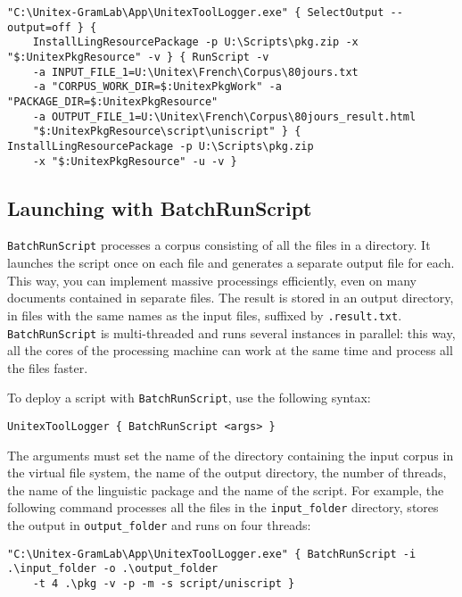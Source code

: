 \begin{Verbatim}[fontsize=\small,fontfamily=helvetica]
"C:\Unitex-GramLab\App\UnitexToolLogger.exe" { SelectOutput --output=off } {
    InstallLingResourcePackage -p U:\Scripts\pkg.zip -x "$:UnitexPkgResource" -v } { RunScript -v
    -a INPUT_FILE_1=U:\Unitex\French\Corpus\80jours.txt 
    -a "CORPUS_WORK_DIR=$:UnitexPkgWork" -a "PACKAGE_DIR=$:UnitexPkgResource"
    -a OUTPUT_FILE_1=U:\Unitex\French\Corpus\80jours_result.html 
    "$:UnitexPkgResource\script\uniscript" } { InstallLingResourcePackage -p U:\Scripts\pkg.zip 
    -x "$:UnitexPkgResource" -u -v }
\end{Verbatim}



\subsection{Launching with BatchRunScript}
\label{launch-script}

\verb$BatchRunScript$ processes a corpus consisting of all the files in a directory.
It launches the script once on each file and generates a separate output file for each.
This way, you can implement massive processings efficiently, even on many documents
contained in separate files. The result is stored in an output directory, in files
with the same names as the input files, suffixed by \verb$.result.txt$.
\verb$BatchRunScript$ is multi-threaded and runs several instances in parallel: this way,
all the cores of the processing machine can work at the same time and process all the files faster.

\bigskip
\noindent To deploy a script with \verb$BatchRunScript$, use the following syntax:

\begin{verbatim}
UnitexToolLogger { BatchRunScript <args> }
\end{verbatim}

\noindent The arguments must set the name of the directory containing the input corpus
in the virtual file system, the name of the output directory, the number of threads, the name
of the linguistic package and the name of the script. For example, the following command processes
all the files in the \verb$input_folder$ directory, stores the output in \verb$output_folder$ and runs
on four threads:

\begin{Verbatim}[fontsize=\small,fontfamily=helvetica]
"C:\Unitex-GramLab\App\UnitexToolLogger.exe" { BatchRunScript -i .\input_folder -o .\output_folder 
    -t 4 .\pkg -v -p -m -s script/uniscript }
\end{Verbatim}

